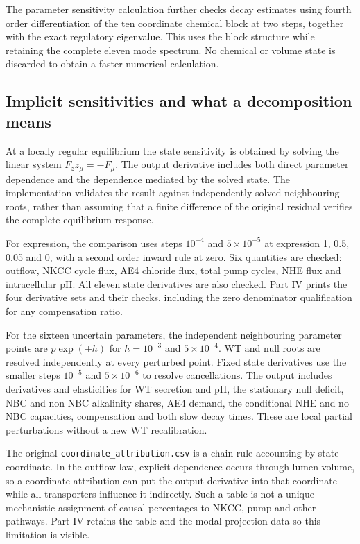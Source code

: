 The parameter sensitivity calculation further checks decay estimates using fourth order differentiation of the ten coordinate chemical block at two steps, together with the exact regulatory eigenvalue. This uses the block structure while retaining the complete eleven mode spectrum. No chemical or volume state is discarded to obtain a faster numerical calculation.

\subsection{Implicit sensitivities and what a decomposition means}
At a locally regular equilibrium the state sensitivity is obtained by solving the linear system $F_z z_\mu=-F_\mu$. The output derivative includes both direct parameter dependence and the dependence mediated by the solved state. The implementation validates the result against independently solved neighbouring roots, rather than assuming that a finite difference of the original residual verifies the complete equilibrium response.

For expression, the comparison uses steps $10^{-4}$ and $5\times10^{-5}$ at expression 1, 0.5, 0.05 and 0, with a second order inward rule at zero. Six quantities are checked: outflow, NKCC cycle flux, AE4 chloride flux, total pump cycles, NHE flux and intracellular pH. All eleven state derivatives are also checked. Part IV prints the four derivative sets and their checks, including the zero denominator qualification for any compensation ratio.

For the sixteen uncertain parameters, the independent neighbouring parameter points are $p\exp(\pm h)$ for $h=10^{-3}$ and $5\times10^{-4}$. WT and null roots are resolved independently at every perturbed point. Fixed state derivatives use the smaller steps $10^{-5}$ and $5\times10^{-6}$ to resolve cancellations. The output includes derivatives and elasticities for WT secretion and pH, the stationary null deficit, NBC and non NBC alkalinity shares, AE4 demand, the conditional NHE and no NBC capacities, compensation and both slow decay times. These are local partial perturbations without a new WT recalibration.

The original \texttt{coordinate\_attribution.csv} is a chain rule accounting by state coordinate. In the outflow law, explicit dependence occurs through lumen volume, so a coordinate attribution can put the output derivative into that coordinate while all transporters influence it indirectly. Such a table is not a unique mechanistic assignment of causal percentages to NKCC, pump and other pathways. Part IV retains the table and the modal projection data so this limitation is visible.

